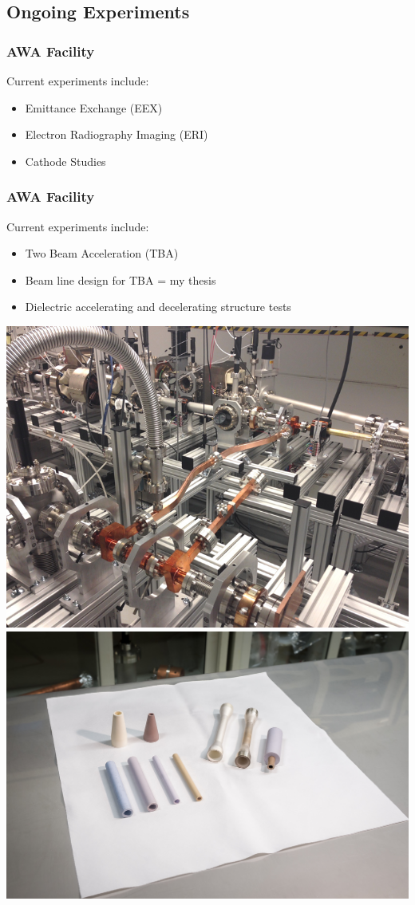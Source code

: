 \documentclass[professionalfonts,t]{beamer}
\begin{document}
\subsection{Ongoing Experiments}
\begin{frame}
	\frametitle{AWA Facility}
	Current experiments include:
	\begin{itemize}
		\item{Emittance Exchange (EEX)}
		\item{Electron Radiography Imaging (ERI)}
		\item{Cathode Studies}
	\end{itemize}
	\vspace{0.3cm}
	\centering
\end{frame}
\begin{frame}[t]
	\frametitle{AWA Facility}
	Current experiments include:
	\begin{itemize}
		\item{Two Beam Acceleration (TBA)}
		\item{Beam line design for TBA = my thesis}
		\item{Dielectric accelerating and decelerating structure tests}	
	\end{itemize}
    \vspace{1em}
	\includegraphics[width=0.5\linewidth, trim={0 0 0 1.65cm},clip]{../images/stage}\hfill%
	\includegraphics[width=0.5\linewidth]{../images/dielectrics}	
\end{frame}
\end{document}
